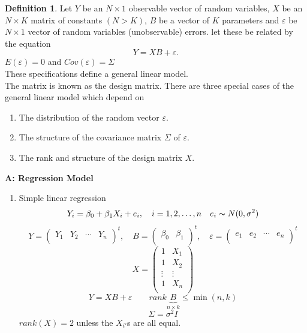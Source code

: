 \documentclass[11pt,a4paper]{article}
\theoremstyle{definition}
\newtheorem{defn}[thm]{Definition}
\newcommand{\subhead}[1]{%
  \par\medskip\noindent\textbf{#1}\par\nobreak\smallskip}
\begin{document}
\begin{defn}\label{res:defn:2.1.1}
Let $Y$ be an $N\times 1$ observable vector of random variables, $X$ be an $N\times K$ matrix of constants $(N>K)$, $B$ be a vector of $K$ parameters and $\varepsilon$ be $N\times 1$ vector of random variables (unobservable) errors. let these be related by the equation \begin{equation}\label{eq:glm}Y=XB + \varepsilon .\end{equation}
$E(\varepsilon)=0$ and $Cov(\varepsilon)=\Sigma$\\
These specifications define a general linear model.\\


The matrix is known as the design matrix. There are three special cases of the general linear model which depend on
\begin{enumerate}
\item[i).] The distribution of the random vector $\varepsilon$.
\item[ii).] The structure of the covariance matrix $\Sigma$ of $\varepsilon$.
\item[iii).] The rank and structure of the design matrix $X$.\\
\end{enumerate}


\begin{center}
\subhead{A: Regression Model}
\end{center}
\begin{enumerate}
\item[i).] Simple linear regression $$Y_i=\beta_0 +\beta_1X_i +e_i,\quad  i=1,2,\ldots ,n\quad  e_i\thicksim N(0,\sigma^2)$$
$$Y=
\begin{pmatrix}
Y_1 & Y_2 & \cdots & Y_n\\
\end{pmatrix}^t,
\quad 
B=
\begin{pmatrix}
\beta_0 & \beta_1\\
\end{pmatrix}^t,
\quad 
\varepsilon =
\begin{pmatrix}
e_1 & e_2 & \cdots & e_n\\
\end{pmatrix}^t
$$
$$X=
\begin{pmatrix}
1 & X_1\\
1 & X_2\\
\vdots & \vdots\\
1 & X_n\\
\end{pmatrix}
$$
$$Y=XB +\varepsilon\qquad  rank\underbrace{B}_{n\times k}\leq \min (n,k)$$
$$\Sigma = \sigma^2 I$$
$rank(X)=2$ unless the $X_{i'}$s are all equal.\\



\end{enumerate}
\end{defn}
\end{document}

